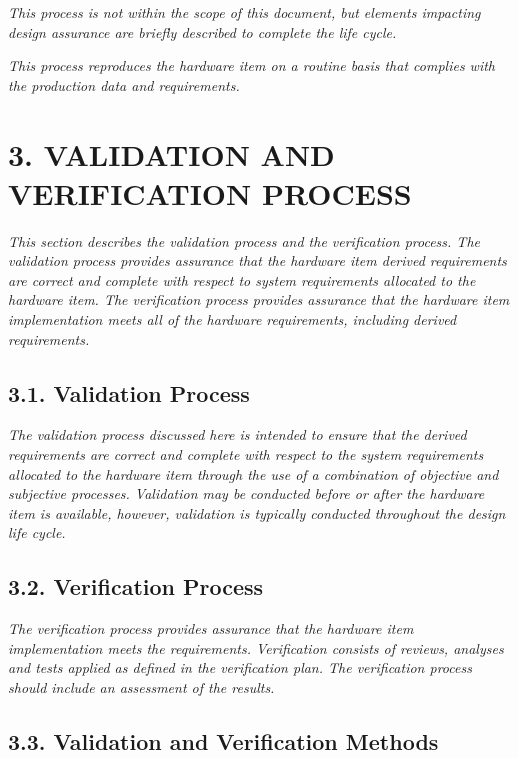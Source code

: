 \documentclass[
]{article}
\begin{document}
\emph{This process is not within the scope of this document, but
elements impacting design assurance are briefly described to complete
the life cycle.}

\emph{This process reproduces the hardware item on a routine basis that
complies with the production data and requirements.}

\hypertarget{validation-and-verification-process}{%
\section{3. VALIDATION AND VERIFICATION
PROCESS}\label{validation-and-verification-process}}

\emph{This section describes the validation process and the verification
process. The validation process provides assurance that the hardware
item derived requirements are correct and complete with respect to
system requirements allocated to the hardware item. The verification
process provides assurance that the hardware item implementation meets
all of the hardware requirements, including derived requirements.}

\hypertarget{validation-process}{%
\subsection{3.1. Validation Process}\label{validation-process}}

\emph{The validation process discussed here is intended to ensure that
the derived requirements are correct and complete with respect to the
system requirements allocated to the hardware item through the use of a
combination of objective and subjective processes. Validation may be
conducted before or after the hardware item is available, however,
validation is typically conducted throughout the design life cycle.}

\hypertarget{verification-process}{%
\subsection{3.2. Verification Process}\label{verification-process}}

\emph{The verification process provides assurance that the hardware item
implementation meets the requirements. Verification consists of reviews,
analyses and tests applied as defined in the verification plan. The
verification process should include an assessment of the results.}

\hypertarget{validation-and-verification-methods}{%
\subsection{3.3. Validation and Verification
Methods}\label{validation-and-verification-methods}}
\end{document}
